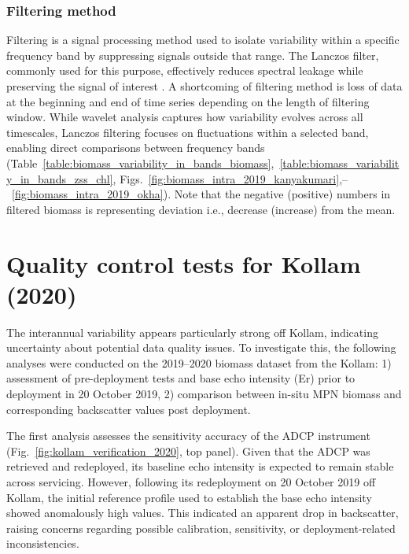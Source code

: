\documentclass[12pt,a4paper]{article}
\begin{document}
\subsubsection{Filtering method}
\label{sec:filtering_method}
Filtering is a signal processing method used to isolate variability within a specific frequency band by suppressing signals outside that range. The Lanczos filter, commonly used for this purpose, effectively reduces spectral leakage while preserving the signal of interest \citep{duchon1979lanczos}. A shortcoming of filtering method is loss of data at the beginning and end of time series depending on the length of filtering window. While wavelet analysis captures how variability evolves across all timescales, Lanczos filtering focuses on fluctuations within a selected band, enabling direct comparisons between frequency bands (Table~\ref{table:biomass_variability_in_bands_biomass},~\ref{table:biomass_variability_in_bands_zss_chl}, Figs.~\ref{fig:biomass_intra_2019_kanyakumari},--~\ref{fig:biomass_intra_2019_okha}). Note that the negative (positive) numbers in filtered biomass is representing deviation i.e., decrease (increase) from the mean. 


\section{Quality control tests for Kollam (2020)}
\label{sec:QC_kollam}
The interannual variability appears particularly strong off Kollam, indicating uncertainty  about potential data quality issues. To investigate this, the following analyses were conducted on the 2019--2020 biomass dataset from the Kollam: 1) assessment of pre-deployment tests and base echo intensity (Er) prior to deployment in 20 October 2019, 2) comparison between in-situ MPN biomass and corresponding backscatter values post deployment. 

The first analysis assesses the sensitivity accuracy of the ADCP instrument (Fig.~\ref{fig:kollam_verification_2020}, top panel). Given that the ADCP was retrieved and redeployed, its baseline echo intensity is expected to remain stable across servicing. However, following its redeployment on 20 October 2019 off Kollam, the initial reference profile used to establish the base echo intensity showed anomalously high values. This indicated an apparent drop in backscatter, raising concerns regarding possible calibration, sensitivity, or deployment-related inconsistencies.
\end{document}
